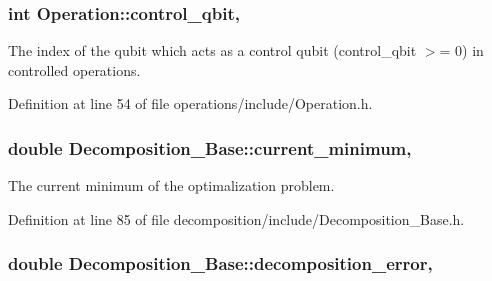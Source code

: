 \subsubsection[{\texorpdfstring{control\+\_\+qbit}{control_qbit}}]{\setlength{\rightskip}{0pt plus 5cm}int Operation\+::control\+\_\+qbit\hspace{0.3cm}{\ttfamily [protected]}, {\ttfamily [inherited]}}\hypertarget{class_operation_a9a798ea8adec5a45fd2ca07996da88e1}{}\label{class_operation_a9a798ea8adec5a45fd2ca07996da88e1}


The index of the qubit which acts as a control qubit (control\+\_\+qbit $>$= 0) in controlled operations. 



Definition at line 54 of file operations/include/\+Operation.\+h.

\subsubsection[{\texorpdfstring{current\+\_\+minimum}{current_minimum}}]{\setlength{\rightskip}{0pt plus 5cm}double Decomposition\+\_\+\+Base\+::current\+\_\+minimum\hspace{0.3cm}{\ttfamily [protected]}, {\ttfamily [inherited]}}\hypertarget{class_decomposition___base_a7a8a6050c20f7965286792493a55d877}{}\label{class_decomposition___base_a7a8a6050c20f7965286792493a55d877}


The current minimum of the optimalization problem. 



Definition at line 85 of file decomposition/include/\+Decomposition\+\_\+\+Base.\+h.

\subsubsection[{\texorpdfstring{decomposition\+\_\+error}{decomposition_error}}]{\setlength{\rightskip}{0pt plus 5cm}double Decomposition\+\_\+\+Base\+::decomposition\+\_\+error\hspace{0.3cm}{\ttfamily [protected]}, {\ttfamily [inherited]}}\hypertarget{class_decomposition___base_a9b181a78ecfd103c9b233ddafa2defdd}{}\label{class_decomposition___base_a9b181a78ecfd103c9b233ddafa2defdd}


